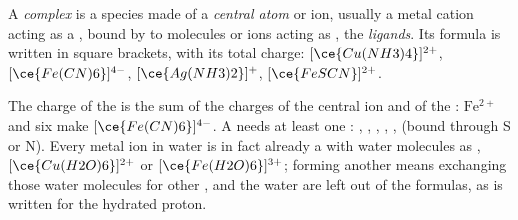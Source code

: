 \begin{definition}\label{def:b1:complexation:complex}
A \emph{complex} is a species made of a \emph{central
atom} or ion, usually a metal cation acting as a
, bound by  to molecules or ions acting as , the \emph{ligands}. Its formula is written in
square brackets, with its total charge: $[\ce{Cu(NH3)4}]^{2+}$,
$[\ce{Fe(CN)6}]^{4-}$, $[\ce{Ag(NH3)2}]^{+}$, $[\ce{FeSCN}]^{2+}$.
\end{definition}

The charge of the  is the sum of the charges of the central ion
and of the : $\mathrm{Fe^{2+}}$ and six  make
$[\ce{Fe(CN)6}]^{4-}$. A  needs at least one : ,
, , , ,  (bound through S or N).
Every metal ion in water is in fact already a  with water
molecules as , $[\ce{Cu(H2O)6}]^{2+}$ or $[\ce{Fe(H2O)6}]^{3+}$;
forming another  means exchanging those water molecules for other
, and the water  are left out of the formulas, as 
is written for the hydrated proton.

